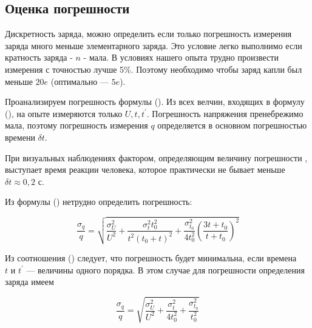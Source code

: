 \documentclass{lab}
\begin{document}
\subsection*{Оценка погрешности}

Дискретность заряда, можно определить если только погрешность измерения заряда много меньше элементарного заряда. Это условие легко выполнимо если кратность заряда - $n$ - мала. В условиях нашего опыта трудно произвести измерения с точностью лучше 5\%. Поэтому необходимо чтобы заряд капли был меньше $20e$ (оптимально — $5e$).

Проанализируем погрешность формулы (). Из всех велчин, входящих в формулу (), на опыте измеряются только $U, t, t^{'}$. Погрешность напряжения пренебрежимо мала, поэтому погрешность измерения $q$  определяется в основном погрешностью времени $\delta t$.

При визуальных наблюдениях фактором, определяющим величину погрешности , выступает время реакции человека, которое практически не бывает меньше $\delta t \approx 0,2$ с.

Из формулы () нетрудно определить погрешность:

\begin{equation}
    \frac{\sigma_q}{q} = \sqrt{{\frac{\sigma^2_{U}}{U^{2}} + \frac{\sigma^2_{t} t_{0}^{2}}{t^{2} (t_{0}+t)^{2}}} + \frac{\sigma^2_{t_0}}{4t_{0}^{2}} \left(\frac{3 t + t_{0}}{t + t_{0}}\right)^{2}}
    \label{eq:q_deviation}
\end{equation}

Из соотношения () следует, что погрешность будет минимальна, если
времена $t \text{ и } t^{'}$ — величины одного порядка. В этом случае для
погрешности определения заряда имеем

\begin{equation}
    \frac{\sigma_q}{q} = \sqrt{\frac{\sigma^2_{U}}{U^{2}} + \frac{\sigma^2_{t}}{4t_{0}^{2}} + \frac{\sigma^2_{t_0}}{t_{0}^{2}}}
    \label{eq:q_deviation_final}
\end{equation}

\newpage
\end{document}
